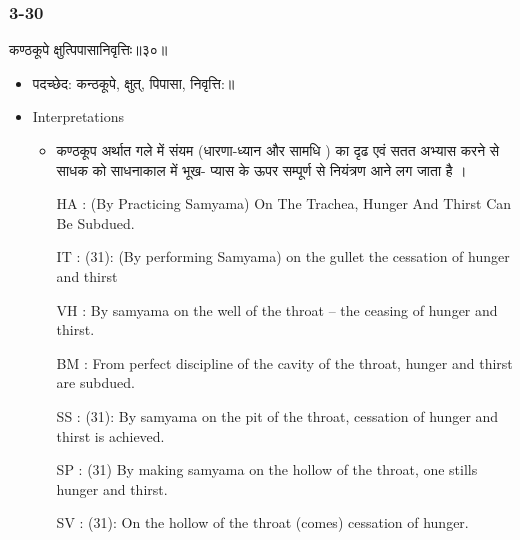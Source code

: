 \begin{frame}[fragile]\frametitle{3-30}
\begin{sanskrit}
कण्ठकूपे क्षुत्पिपासानिवृत्तिः॥३०॥
\end{sanskrit}

	\begin{itemize}
	\item पदच्छेद:  कन्ठकूपे, क्षुत्, पिपासा, निवृत्ति:‌॥
	\item Interpretations
		\begin{itemize}	
		\item  कण्ठकूप अर्थात गले में  संयम (धारणा-ध्यान और सामधि ) का दृढ एवं सतत अभ्यास करने से साधक को साधनाकाल में भूख- प्यास के ऊपर सम्पूर्ण से नियंत्रण आने लग  जाता है ।
		\item [HA]: (By Practicing Samyama) On The Trachea, Hunger And Thirst Can Be Subdued.
		\item [IT]: (31): (By performing Samyama) on the gullet the cessation of hunger and thirst
		\item [VH]: By samyama on the well of the throat – the ceasing of hunger and thirst.
		\item [BM]: From perfect discipline of the cavity of the throat, hunger and thirst are subdued.
		\item [SS]: (31): By samyama on the pit of the throat, cessation of hunger and thirst is achieved.
		\item [SP]: (31) By making samyama on the hollow of the throat, one stills hunger and thirst.
		\item [SV]: (31): On the hollow of the throat (comes) cessation of hunger. 
		\end{itemize}
	\end{itemize}
\end{frame}


